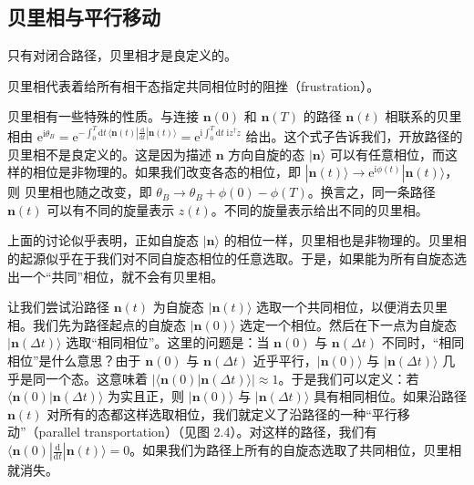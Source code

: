 \subsection{贝里相与平行移动}

\begin{keypoints}
\item 只有对闭合路径，贝里相才是良定义的。
\item 贝里相代表着给所有相干态指定共同相位时的阻挫（frustration）。
\end{keypoints}

贝里相有一些特殊的性质。与连接 $\pmb{n}(0)$ 和 $\pmb{n}(T)$ 的路径 $\pmb{n}(t)$ 相联系的贝里相由 $\mathrm{e}^{\mathrm{i}\theta_B} = \mathrm{e}^{-\int_0^T \mathrm{d}t\, \langle\pmb{n}(t)|\frac{\mathrm{d}}{\mathrm{d}t}|\pmb{n}(t)\rangle} = \mathrm{e}^{\mathrm{i}\int_0^T \mathrm{d}t\; \mathrm{i}z^{\dagger}\dot{z}}$ 给出。这个式子告诉我们，开放路径的贝里相不是良定义的。这是因为描述 $\pmb{n}$ 方向自旋的态 $|\pmb{n}\rangle$ 可以有任意相位，而这样的相位是非物理的。如果我们改变各态的相位，即 $|\pmb{n}(t)\rangle \to \mathrm{e}^{\mathrm{i}\phi(t)}|\pmb{n}(t)\rangle$，则
贝里相也随之改变，即 $\theta_B \to \theta_B + \phi(0) - \phi(T)$。换言之，同一条路径 $\pmb{n}(t)$ 可以有不同的旋量表示 $z(t)$。不同的旋量表示给出不同的贝里相。

上面的讨论似乎表明，正如自旋态 $|\pmb{n}\rangle$ 的相位一样，贝里相也是非物理的。贝里相的起源似乎在于我们对不同自旋态相位的任意选取。于是，如果能为所有自旋态选出一个“共同”相位，就不会有贝里相。

让我们尝试沿路径 $\pmb{n}(t)$ 为自旋态 $|\pmb{n}(t)\rangle$ 选取一个共同相位，以便消去贝里相。我们先为路径起点的自旋态 $|\pmb{n}(0)\rangle$ 选定一个相位。然后在下一点为自旋态 $|\pmb{n}(\Delta t)\rangle$ 选取“相同相位”。这里的问题是：当 $\pmb{n}(0)$ 与 $\pmb{n}(\Delta t)$ 不同时，“相同相位”是什么意思？由于 $\pmb{n}(0)$ 与 $\pmb{n}(\Delta t)$ 近乎平行，$|\pmb{n}(0)\rangle$ 与 $|\pmb{n}(\Delta t)\rangle$ 几乎是同一个态。这意味着 $\bigl|\langle\pmb{n}(0)|\pmb{n}(\Delta t)\rangle\bigr| \approx 1$。于是我们可以定义：若 $\langle\pmb{n}(0)|\pmb{n}(\Delta t)\rangle$ 为实且正，则 $|\pmb{n}(0)\rangle$ 与 $|\pmb{n}(\Delta t)\rangle$ 具有相同相位。如果沿路径 $\pmb{n}(t)$ 对所有的态都这样选取相位，我们就定义了沿路径的一种“平行移动”（parallel transportation）（见图 2.4）。对这样的路径，我们有 $\langle\pmb{n}(0)|\frac{\mathrm{d}}{\mathrm{d}t}|\pmb{n}(t)\rangle = 0$。如果我们为路径上所有的自旋态选取了共同相位，贝里相就消失。

